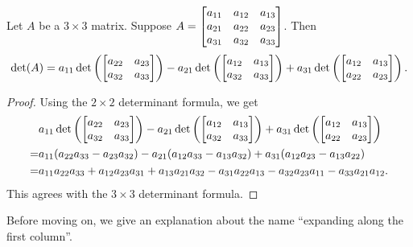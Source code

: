 \begin{theorem}
	Let $A$ be a $3\times 3$ matrix. Suppose
	$A=\mat{a_{11} & a_{12} & a_{13} \\ a_{21} & a_{22} & a_{23} \\ a_{31} & a_{32} & a_{33}}$.
	Then
	\[
		\det(A)=a_{11}\det\left(\mat{a_{22} & a_{23} \\ a_{32} & a_{33}}\right)-a_{21}\det\left(\mat{a_{12} & a_{13} \\ a_{32} & a_{33}}\right)+a_{31}\det\left(\mat{a_{12} & a_{13} \\ a_{22} & a_{23}}\right).
	\]
\end{theorem}
\begin{proof}
	Using the $2\times 2$ determinant formula, we get
	\begin{align*}
		  & a_{11}\det\left(\mat{a_{22} & a_{23} \\ a_{32} & a_{33}}\right)-a_{21}\det\left(\mat{a_{12} & a_{13} \\ a_{32} & a_{33}}\right)+a_{31}\det\left(\mat{a_{12} & a_{13} \\ a_{22} & a_{23}}\right) \\
		= & a_{11}(a_{22}a_{33}-a_{23}a_{32})-a_{21}(a_{12}a_{33}-a_{13}a_{32})+a_{31}(a_{12}a_{23}-a_{13}a_{22})                                                    \\
		= & a_{11}a_{22}a_{33}+a_{12}a_{23}a_{31}+a_{13}a_{21}a_{32}-a_{31}a_{22}a_{13}-a_{32}a_{23}a_{11}-a_{33}a_{21}a_{12}.
	\end{align*}
	This agrees with the $3\times 3$ determinant formula.
\end{proof}

Before moving on, we give an explanation about the name ``expanding along the first
column''.

